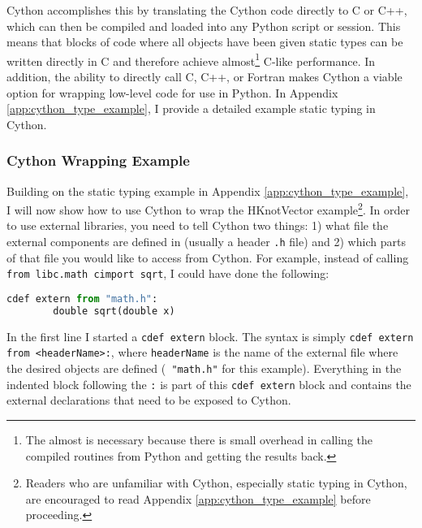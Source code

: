   \mainstretch{}
  Cython accomplishes this by translating the Cython code directly to C or C++, which can then be compiled and loaded into any Python script or session. This means that blocks of code where all objects have been given static types can be written directly in C and therefore achieve almost\footnote{The almost is necessary because there is small overhead in calling the compiled routines from Python and getting the results back.} C-like performance. In addition, the ability to directly call C, C++, or Fortran makes Cython a viable option for wrapping low-level code for use in Python. In Appendix \ref{app:cython_type_example}, I provide a detailed example static typing in Cython.

  \subsubsection{Cython Wrapping Example} \label{ssub:cython_wrapping_example}

    Building on the static typing example in Appendix \ref{app:cython_type_example}, I will now show how to use Cython to wrap the HKnotVector example\footnote{Readers who are unfamiliar with Cython, especially static typing in Cython, are encouraged to read Appendix \ref{app:cython_type_example} before proceeding.}. In order to use external libraries, you need to tell Cython two things: 1) what file the external components are defined in (usually a header \texttt{.h} file) and 2) which parts of that file you would like to access from Cython. For example, instead of calling \texttt{from libc.math cimport sqrt}, I could have done the following:

    \vspace{.2in}
    \begin{lstlisting}[language=python]
    cdef extern from "math.h":
        double sqrt(double x)
    \end{lstlisting}
    \mainstretch{}

    \noindent In the first line I started a \texttt{cdef extern} block. The syntax is simply \texttt{cdef extern from <headerName>:}, where \texttt{headerName} is the name of the external file where the desired objects are defined (\texttt{ "math.h"} for this example). Everything in the indented block following the \texttt{:} is part of this \texttt{cdef extern} block and contains the external declarations that need to be exposed to Cython.

